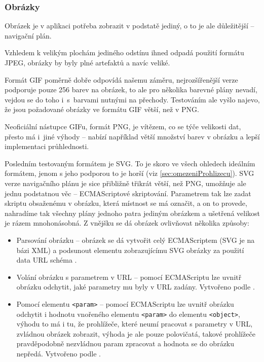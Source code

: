 \subsubsection{Obrázky}
Obrázek je v aplikaci potřeba zobrazit v podstatě jediný, o to je ale důležitější -- navigační plán.

Vzhledem k velikým plochám jediného odstínu ihned odpadá použití formátu JPEG, obrázky by byly plné artefaktů a navíc veliké. 

Formát GIF poměrně dobře odpovídá našemu záměru, nejrozšířenější verze podporuje pouze 256 barev na obrázek, to ale pro několika barevné plány nevadí, vejdou se do toho i~s~barvami nutnými na přechody. Testováním ale vyšlo najevo, že jsou požadované obrázky ve formátu GIF větší, než v PNG.

Neoficiální nástupce GIFu, formát PNG, je vítězem, co se týče velikosti dat, přesto má i~jiné výhody -- nabízí například větší množství barev v obrázku a lepší implementaci průhlednosti.

Posledním testovaným formátem je SVG. To je skoro ve všech ohledech ideálním formátem, jenom s jeho podporou to je horší (viz \ref{sec:omezeniProhlizecu}). SVG verze navigačního plánu je sice přibližně třikrát větší, než PNG, umožňuje ale jednu podstatnou věc -- ECMAScriptové skriptování. Parametrem tak lze zadat skriptu obsaženému v obrázku, která místnost se má označit, a on to provede, nahradíme tak všechny plány jednoho patra jediným obrázkem a ušetřená velikost je rázem mnohonásobná. Z vnějšku se dá obrázek ovlivňovat několika způsoby:
\begin{itemize}
\item Parsování obrázku -- obrázek se dá vytvořit celý ECMAScriptem (SVG je na bázi XML) a podsunout elementu zobrazujícímu SVG obrázky za použití data URL schéma \cite{DataUrlDoc}.
\item Volání obrázku s parametrem v URL -- pomocí ECMAScriptu lze uvnitř obrázku odchytit, jaké parametry mu byly v URL zadány. Vytvořeno podle \cite{SvgParamsDoc}.
\item Pomocí elementu \texttt{<param>} -- pomocí ECMAScriptu lze uvnitř obrázku odchytit i hodnotu vnořeného elementu \texttt{<param>} do elementu \texttt{<object>}, výhodu to má i tu, že prohlížeče, které neumí pracovat s parametry v URL, zvládnou obrázek zobrazit, výhoda je ale pouze polovičatá, takové prohlížeče pravděpodobně nezvládnou param zpracovat a hodnota se do obrázku nepředá. Vytvořeno podle \cite{SvgParamsDoc}.
\end{itemize}

